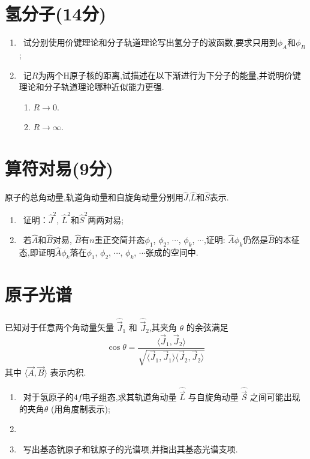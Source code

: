 \documentclass{ctexart}
\begin{document}
\section{氢分子(14分)}
\begin{enumerate}
    \item {}\ 试分别使用价键理论和分子轨道理论写出氢分子的波函数,要求只用到$\phi_A$和$\phi_B$;
    \item {}\ 记$R$为两个H原子核的距离,试描述在以下渐进行为下分子的能量,并说明价键理论和分子轨道理论哪种近似能力更强.
    \begin{enumerate}[label=\Alph*.]
        \item $R\to0$.
        \item $R\to\infty$.
    \end{enumerate}
\end{enumerate}
\section{算符对易(9分)}
原子的总角动量,轨道角动量和自旋角动量分别用$\hat{J}$,$\hat{L}$和$\hat{S}$表示.
\begin{enumerate}[label=\tbf{\arabic*.}]
    \item {}\ 证明：$\hat{J}^2$, $\hat{L}^2$和$\hat{S}^2$两两对易;
    \item {}\ 若$\hat{A}$和$\hat{B}$对易, $\hat{B}$有$n$重正交简并态$\phi_1$, $\phi_2$, $\cdots$, $\phi_k$, $\cdots$,证明: $\hat{A}\phi_k$仍然是$\hat{B}$的本征态,即证明$\hat{A}\phi_k$落在$\phi_1$, $\phi_2$, $\cdots$, $\phi_k$, $\cdots$张成的空间中.
\end{enumerate}
\section{原子光谱}
已知对于任意两个角动量矢量 $\hat{\vec{J}}_1$ 和 $\hat{\vec{J}}_2$,其夹角 $\theta$ 的余弦满足
\[\cos\theta=\frac{\langle \vec{J}_1, \vec{J}_2 \rangle}{\sqrt{\langle \vec{J}_1, \vec{J}_1 \rangle \langle \vec{J}_2, \vec{J}_2\rangle}}\]
其中 $\langle \vec{A}, \vec{B} \rangle$ 表示内积.

\begin{enumerate}[label=\tbf{\arabic*.}]
    \item {}\ 对于氢原子的$4f$电子组态,求其轨道角动量 $\hat{\vec{L}}$ 与自旋角动量 $\hat{\vec{S}}$ 之间可能出现的夹角$\theta$ (用角度制表示);
    \item {}\ 
    \item {}\ 写出基态钪原子和钛原子的光谱项,并指出其基态光谱支项.
\end{enumerate}
\end{document}
